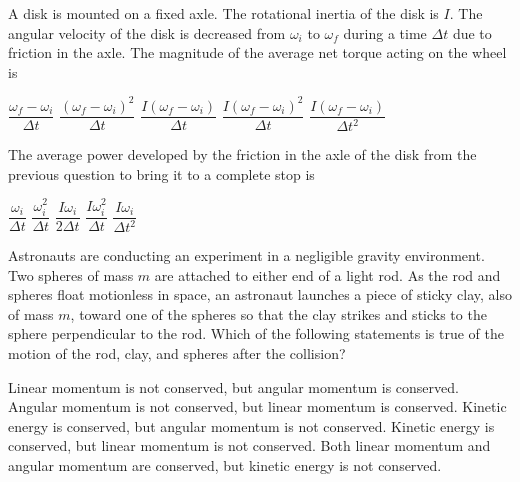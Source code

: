 \documentclass{../../oss-apphys-exam}
\begin{document}
\begin{multicols*}{2}
\begin{questions}
    \question A disk is mounted on a fixed axle. The rotational inertia of the
    disk is $I$. The angular velocity of the disk is decreased from $\omega_i$
    to $\omega_f$ during a time $\Delta t$ due to friction in the axle. The
    magnitude of the average net torque acting on the wheel is
    \begin{choices}
      \choice $\dfrac{\omega_f-\omega_i}{\Delta t}$
      \choice $\dfrac{(\omega_f-\omega_i)^2}{\Delta t}$
      \choice $\dfrac{I(\omega_f-\omega_i)}{\Delta t}$
      \choice $\dfrac{I(\omega_f-\omega_i)^2}{\Delta t}$
      \choice $\dfrac{I(\omega_f-\omega_i)}{\Delta t^2}$
    \end{choices}
    
  \question The average power developed by the friction in the axle of the disk
    from the previous question to bring it to a complete stop is
    \begin{choices}
      \choice $\dfrac{\omega_i}{\Delta t}$
      \choice $\dfrac{\omega_i^2}{\Delta t}$
      \choice $\dfrac{I\omega_i}{2\Delta t}$
      \choice $\dfrac{I\omega_i^2}{\Delta t}$
      \choice $\dfrac{I\omega_i}{\Delta t^2}$
    \end{choices}    
    \columnbreak
    
    \question Astronauts are conducting an experiment in a negligible gravity
    environment. Two spheres of mass $m$ are attached to either end of a light
    rod. As the rod and spheres float motionless in space, an astronaut
    launches a piece of sticky clay, also of mass $m$, toward one of the spheres
    so that the clay strikes and sticks to the sphere perpendicular to the rod.
    Which of the following statements is true of the motion of the rod, clay,
    and spheres after the collision?
    \begin{center}
    \end{center}
    \begin{choices}
      \choice Linear momentum is not conserved, but angular momentum is
      conserved.
      \choice Angular momentum is not conserved, but linear momentum is
      conserved.
      \choice Kinetic energy is conserved, but angular momentum is not
      conserved.
      \choice Kinetic energy is conserved, but linear momentum is not conserved.
      \choice Both linear momentum and angular momentum are conserved, but
      kinetic energy is not conserved.
    \end{choices}
    

\end{questions}
\end{multicols*}
\end{document}
